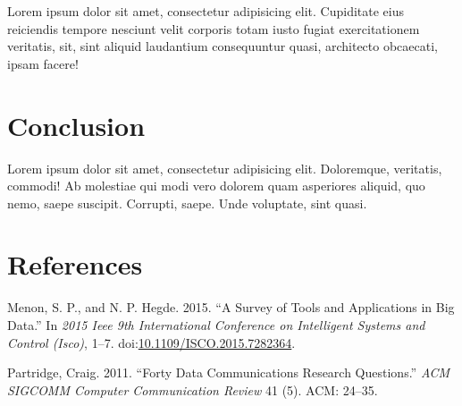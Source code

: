 Lorem ipsum dolor sit amet, consectetur adipisicing elit. Cupiditate
eius reiciendis tempore nesciunt velit corporis totam iusto fugiat
exercitationem veritatis, sit, sint aliquid laudantium consequuntur
quasi, architecto obcaecati, ipsam facere!

\chapter{Conclusion}\label{conclusion}

Lorem ipsum dolor sit amet, consectetur adipisicing elit. Doloremque,
veritatis, commodi! Ab molestiae qui modi vero dolorem quam asperiores
aliquid, quo nemo, saepe suscipit. Corrupti, saepe. Unde voluptate, sint
quasi.

\chapter*{References}\label{references}

\hypertarget{refs}{}
\hypertarget{ref-7282364}{}
Menon, S. P., and N. P. Hegde. 2015. ``A Survey of Tools and
Applications in Big Data.'' In \emph{2015 Ieee 9th International
Conference on Intelligent Systems and Control (Isco)}, 1--7.
doi:\href{https://doi.org/10.1109/ISCO.2015.7282364}{10.1109/ISCO.2015.7282364}.

\hypertarget{ref-partridge2011forty}{}
Partridge, Craig. 2011. ``Forty Data Communications Research
Questions.'' \emph{ACM SIGCOMM Computer Communication Review} 41 (5).
ACM: 24--35.
